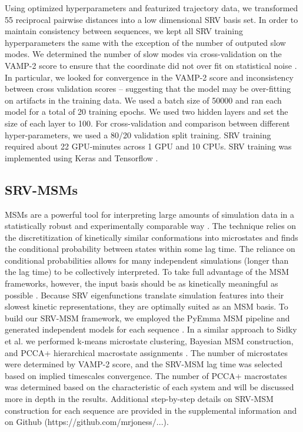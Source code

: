 \documentclass[journal=jpcbfk,manuscript=article]{achemso}
\begin{document}
Using optimized hyperparameters and featurized trajectory data, we transformed 55 reciprocal pairwise distances into a low dimensional SRV basis set. In order to maintain consistency between sequences, we kept all SRV training hyperparameters the same with the exception of the number of outputed slow modes. We determined the number of slow modes via cross-validation on the VAMP-2 score to ensure that the coordinate did not over fit on statistical noise \citep{McGibbon2015VariationalKinetics}. In particular, we looked for convergence in the VAMP-2 score and inconsistency between cross validation scores -- suggesting that the model may be over-fitting on artifacts in the training data. We used a batch size of 50000 and ran each model for a total of 20 training epochs. We used two hidden layers and set the size of each layer to 100. For cross-validation and comparison between different hyper-parameters, we used a 80/20 validation split training. SRV training required about 22 GPU-minutes across 1 GPU and 10 CPUs. SRV training was implemented using Keras and Tensorflow \citep{KerasGithub.Com, Abadi2016TensorFlow:Systems}.


\subsection{\label{sec:methods}SRV-MSMs}

MSMs are a powerful tool for interpreting large amounts of simulation data in a statistically robust and experimentally comparable way \citep{Phys2011MarkovValidation, Husic2018MarkovScience}. The technique relies on the discretitization of kinetically similar conformations into microstates and finds the conditional probability between states within some lag time. The reliance on conditional probabilities allows for many independent simulations (longer than the lag time) to be collectively interpreted. To take full advantage of the MSM frameworks, however, the input basis should be as kinetically meaningful as possible \citep{Pande2010EverythingAsk}. Because SRV eigenfunctions translate simulation features into their slowest kinetic representations, they are optimally suited as an MSM basis. To build our SRV-MSM framework, we employed the PyEmma MSM pipeline and generated independent models for each sequence \citep{Scherer2015PyEMMAModels}. In a similar approach to Sidky et al. we performed k-means microstate clustering, Bayesian MSM construction, and PCCA+ hierarchical macrostate assignments \citep{Sidky}. The number of microstates were determined by VAMP-2 score, and the SRV-MSM lag time was selected based on implied timescales convergence.  The number of PCCA+ macrostates was determined based on the characteristic of each system and will be discussed more in depth in the results. Additional step-by-step details on SRV-MSM construction for each sequence are provided in the supplemental information and on Github (https://github.com/mrjoness/...).
\end{document}
